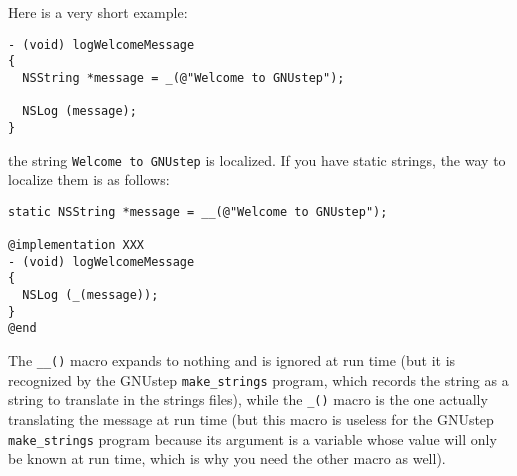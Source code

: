 Here is a very short example:
\begin{verbatim}
- (void) logWelcomeMessage
{
  NSString *message = _(@"Welcome to GNUstep");

  NSLog (message);
}
\end{verbatim}
the string \texttt{Welcome to GNUstep} is localized.  If you have static
strings, the way to localize them is as follows:
\begin{verbatim}
static NSString *message = __(@"Welcome to GNUstep");

@implementation XXX
- (void) logWelcomeMessage
{
  NSLog (_(message));
}
@end
\end{verbatim}
The \texttt{\_\_()} macro expands to nothing and is ignored at run
time (but it is recognized by the GNUstep \texttt{make\_strings}
program, which records the string as a string to translate in the
strings files), while the \texttt{\_()} macro is the one actually
translating the message at run time (but this macro is useless for the
GNUstep \texttt{make\_strings} program because its argument is a
variable whose value will only be known at run time, which is why you
need the other macro as well).
